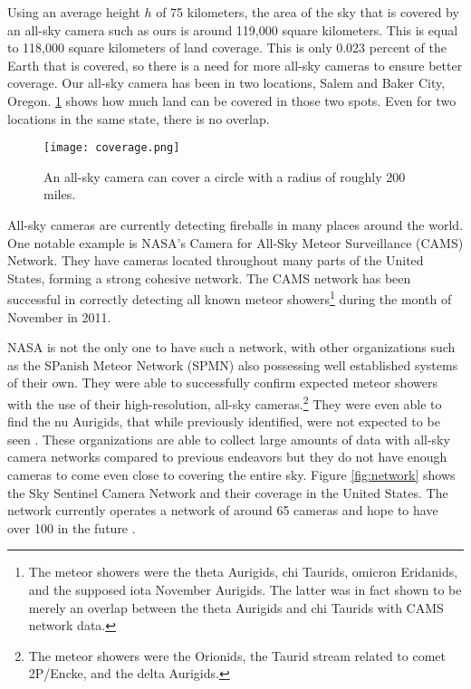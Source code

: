 Using an average height $h$ of 75 kilometers, the area of the sky that is covered by an all-sky camera such as ours is around 119,000 square kilometers. This is equal to 118,000 square kilometers of land coverage. This is only 0.023 percent of the Earth that is covered, so there is a need for more all-sky cameras to ensure better coverage. Our all-sky camera has been in two locations, Salem and Baker City, Oregon. \ref{fig:coverage} shows how much land can be covered in those two spots. Even for two locations in the same state, there is no overlap.

\begin{figure}[ht!]
	\centering
	\texttt{[image: coverage.png]}
	\caption{An all-sky camera can cover a circle with a radius of roughly 200 miles.}
	\label{fig:coverage}
\end{figure}


All-sky cameras are currently detecting fireballs in many places around the world. One notable example is NASA's Camera for All-Sky Meteor Surveillance (CAMS) Network. They have cameras located throughout many parts of the United States, forming a strong cohesive network. The CAMS network has been successful in correctly detecting all known meteor showers\footnote{The meteor showers were the theta Aurigids, chi Taurids, omicron Eridanids, and the supposed iota November Aurigids. The latter was in fact shown to be merely an overlap between the theta Aurigids and chi Taurids with CAMS network data.} during the month of November in 2011\cite{Jenniskens2011}.

NASA is not the only one to have such a network, with other organizations such as the SPanish Meteor Network (SPMN) also possessing well established systems of their own. They were  able to successfully confirm expected meteor showers with the use of their high-resolution, all-sky cameras.\footnote{The meteor showers were the Orionids, the Taurid stream related to comet 2P/Encke, and the delta Aurigids.} They were even able to find the nu Aurigids, that while previously identified, were not expected to be seen \cite{Trigo-Rodriguez2007}. These organizations are able to collect large amounts of data with all-sky camera networks compared to previous endeavors but they do not have enough cameras to come even close to covering the entire sky. Figure \ref{fig:network} shows the Sky Sentinel Camera Network and their coverage in the United States. The network currently operates a network of around 65 cameras and hope to have over 100 in the future \cite{Bannister2012}.

